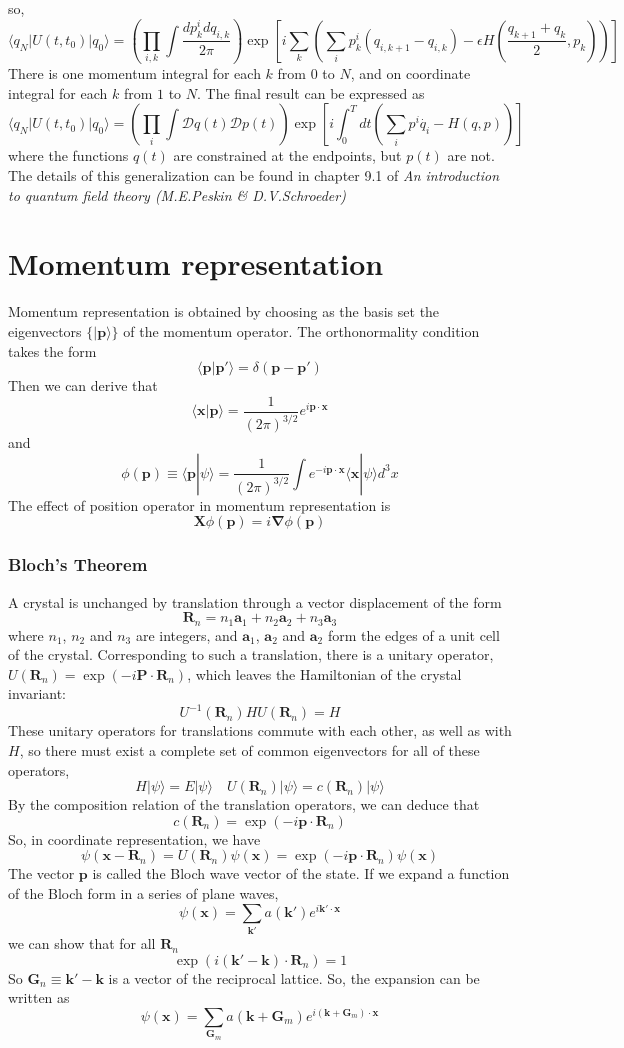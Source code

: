 \documentclass[cyan]{elegantnote}
\begin{document}
so,
\[\langle q_{N} | U(t,t_0) | q_{0}\rangle = \left( \prod_{i,k} \int \frac{dp^i_k dq_{i,k}}{2\pi}\right) \exp \left[ i\sum_k \left( \sum_i p_k^i (q_{i,k+1} - q_{i,k})-\epsilon H \left( \frac{q_{k+1}+q_{k}}{2},p_k\right)\right) \right]\]
There is one momentum integral for each $k$ from $0$ to $N$, and on coordinate integral for each $k$ from $1$ to $N$.
The final result can be expressed as
\[\langle q_{N} | U(t,t_0) | q_{0}\rangle = \left( \prod_{i} \int \mathcal{D}q(t) \mathcal{D}p(t) \right) \exp \left[ i \int_0^T dt \left( \sum_i p^i \dot{q_i} - H \left( q,p\right)\right) \right]\]
where the functions $q(t)$ are constrained at the endpoints, but $p(t)$ are not. 
The details of this generalization can be found in  chapter 9.1 of \emph{An introduction to quantum field theory (M.E.Peskin \& D.V.Schroeder)}

\section{Momentum representation}
Momentum representation is obtained by choosing as the basis set the eigenvectors $\{|\bm{p}\rangle\}$ of the momentum operator. The orthonormality condition takes the form
\[\langle \bm{p} | \bm{p}' \rangle = \delta(\bm{p}-\bm{p}')\]
Then we can derive that
\[\langle \bm{x} | \bm{p} \rangle = \frac{1}{(2\pi)^{3/2}} e^{i\bm{p}\cdot\bm{x}}\]
and
\[\phi(\bm{p}) \equiv \langle \bm{p} | \psi \rangle = \frac{1}{(2\pi)^{3/2}} \int e^{-i\bm{p}\cdot\bm{x}} \langle \bm{x} | \psi \rangle d^3 x\]
The effect of position operator in momentum representation is
\[\bm{X}\phi(\bm{p}) = i\bm{\nabla} \phi(\bm{p})\]
\subsubsection{Bloch's Theorem}
A crystal is unchanged by translation through a vector displacement of the form
\[\bm{R}_n = n_1\bm{a}_1 + n_2\bm{a}_2 + n_3\bm{a}_3\]
where $n_1$, $n_2$ and $n_3$ are integers, and $\bm{a}_1$, $\bm{a}_2$ and $\bm{a}_2$ form the edges of a unit cell of the crystal. Corresponding to such a translation, there is a unitary operator, $U(\bm{R}_n) = \exp(-i\bm{P}\cdot \bm{R}_n)$, which leaves the Hamiltonian of the crystal invariant:
\[U^{-1}(\bm{R}_n) H U(\bm{R}_n) = H\]
These unitary operators for translations commute with each other, as well as with $H$, so there must exist a complete set of common eigenvectors for all of these operators,
\[H|\psi\rangle = E|\psi\rangle \quad U(\bm{R}_n)|\psi\rangle = c(\bm{R}_n)|\psi\rangle\]
By the composition relation of the translation operators, we can deduce that
\[c(\bm{R}_n) = \exp(-i\bm{p}\cdot\bm{R}_n)\]
So, in coordinate representation, we have
\[\psi(\bm{x} - \bm{R}_n) = U(\bm{R}_n) \psi(\bm{x}) = \exp(-i\bm{p}\cdot\bm{R}_n) \psi(\bm{x})\]
The vector $\bm{p}$ is called the Bloch wave vector of the state. If we expand a function of the Bloch form in a series of plane waves, 
\[\psi(\bm{x}) = \sum_{\bm{k}'} a(\bm{k}') e^{i\bm{k}'\cdot \bm{x}}\]
we can show that for all $\bm{R}_n$
\[\exp(i(\bm{k}' - \bm{k})\cdot \bm{R}_n) = 1 \]
So $\bm{G}_n \equiv \bm{k}' - \bm{k}$ is a vector of the reciprocal lattice. So, the expansion can be written as
\[\psi(\bm{x}) = \sum_{\bm{G}_m} a(\bm{k} + \bm{G}_m) e^{i(\bm{k} + \bm{G}_m)\cdot\bm{x}}\]
\end{document}
